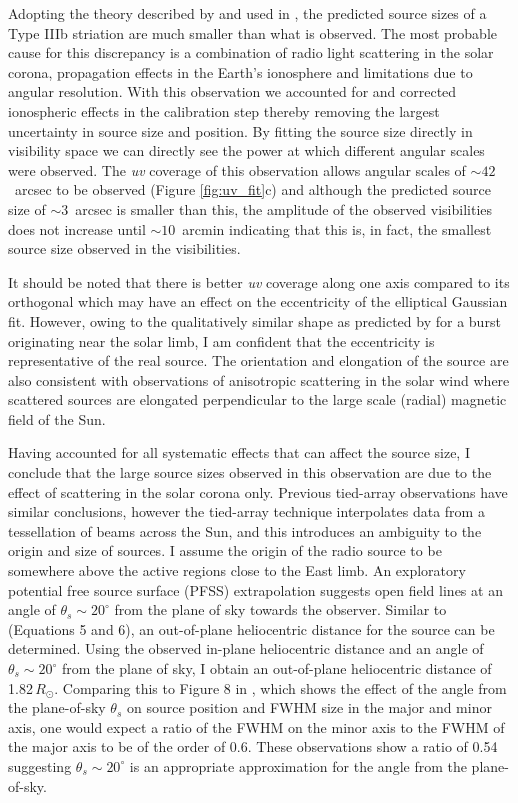Adopting the theory described by \cite{Takakura1975} and used in \cite{Kontar2017}, the predicted source sizes of a Type IIIb striation are much smaller than what is observed. The most probable cause for this discrepancy is a combination of radio light scattering in the solar corona, propagation effects in the Earth's ionosphere and limitations due to angular resolution.
With this observation we accounted for and corrected ionospheric effects in the calibration step \citep[Section \ref{sec:data} and ][]{DeGasperin2019} thereby removing the largest uncertainty in source size and position. By fitting the source size directly in visibility space we can directly see the power at which different angular scales were observed. The \textit{uv} coverage of this observation allows angular scales of ${\sim} 42$~arcsec to be observed (Figure \ref{fig:uv_fit}c) and although the predicted source size of ${\sim}3$~arcsec is smaller than this, the amplitude of the observed visibilities does not increase until ${\sim} 10$~arcmin indicating that this is, in fact, the smallest source size observed in the visibilities.

It should be noted that there is better \textit{uv} coverage along one axis compared to its orthogonal which may have an effect on the eccentricity of the elliptical Gaussian fit. However, owing to the qualitatively similar shape as predicted by \cite{Kontar2019} for a burst originating near the solar limb, I am confident that the eccentricity is representative of the real source. The orientation and elongation of the source are also consistent with observations of anisotropic scattering in the solar wind \citep{Anantharamaiah1994, Ingale2015} where scattered sources are elongated perpendicular to the large scale (radial) magnetic field of the Sun.

Having accounted for all systematic effects that can affect the source size, I conclude that the large source sizes observed in this observation are due to the effect of scattering in the solar corona only. Previous tied-array observations have similar conclusions, however the tied-array technique interpolates data from a tessellation of beams across the Sun, and this introduces an ambiguity to the origin and size of sources. 
I assume the origin of the radio source to be somewhere above the active regions close to the East limb. 
An exploratory potential free source surface (PFSS) extrapolation suggests open field lines at an angle of $ \theta_s {\sim} 20^\circ$ from the plane of sky towards the observer. Similar to \cite{Chrysaphi2018} (Equations 5 and 6), an out-of-plane heliocentric distance for the source can be determined. Using the observed in-plane heliocentric distance and an angle of $ \theta_s {\sim} 20^\circ$ from the plane of sky, I obtain an out-of-plane heliocentric distance of 1.82$\, R_\odot$. Comparing this to Figure 8 in \cite{Kontar2019}, which shows the effect of the angle from the plane-of-sky $\theta_s$ on source position and FWHM size in the major and minor axis, one would expect a ratio of the FWHM on the minor axis to the FWHM of the major axis to be of the order of 0.6. These observations show a ratio of 0.54 suggesting $ \theta_s {\sim} 20^\circ$ is an appropriate approximation for the angle from the plane-of-sky.

